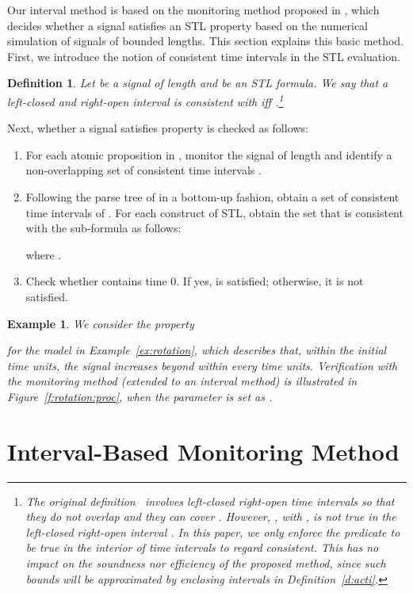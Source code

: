 \documentclass[paper]{ieice}
\newtheorem{definition}{Definition}
\newtheorem{example}{Example}
\begin{document}
Our interval method is based on the monitoring method proposed in \cite{Maler2003}, which decides whether a signal satisfies an STL property based on the numerical simulation of signals of bounded lengths.
This section explains this basic method.
First, we introduce the notion of consistent time intervals in the STL evaluation.
\begin{definition} \label{th:consistent}
	Let  be a signal of length  and  be an STL formula.
	We say that a left-closed and right-open interval  is \emph{consistent} with  iff .\footnote{The original definition~\cite{Maler2003} involves left-closed right-open time intervals  so that they do not overlap and they can cover . However, , with , is not true in the left-closed right-open interval . In this paper, we only enforce the predicate to be true in the interior of time intervals  to regard  consistent. This has no impact on the soundness nor efficiency of the proposed method, since such bounds will be approximated by enclosing intervals in Definition~\ref{d:acti}.}
\end{definition}

Next, whether a signal satisfies property  is checked as follows:
\begin{enumerate}
	\item For each atomic proposition  in , monitor the signal of length  and identify a non-overlapping set of consistent time intervals .
\item Following the parse tree of  in a bottom-up fashion, obtain a set of consistent time intervals of . For each construct of STL, obtain the set that is consistent with the sub-formula as follows:

where .
\item Check whether  contains time 0.
	If yes,  is satisfied; otherwise, it is not satisfied.
\end{enumerate}

\begin{example} \label{ex:stl}
	We consider the property 
	
	for the model in Example~\ref{ex:rotation}, which describes that, within the initial  time units, the signal  increases beyond  within every  time units.
	Verification with the monitoring method (extended to an interval method) is illustrated in Figure~\ref{f:rotation:proc}, when the parameter is set as .
\end{example}


\section{Interval-Based Monitoring Method}
\label{s:method}
\end{document}
